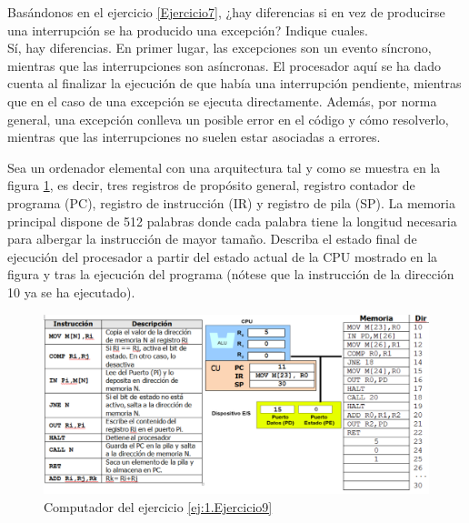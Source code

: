 \begin{ejercicio}
    Basándonos en el ejercicio \ref{Ejercicio7}, ¿hay diferencias si en vez de producirse una interrupción se ha producido una excepción? Indique cuales.\\

    Sí, hay diferencias. En primer lugar, las excepciones son un evento síncrono, mientras que las interrupciones son asíncronas. El procesador aquí se ha dado cuenta al finalizar la ejecución de que había una interrupción pendiente, mientras que en el caso de una excepción se ejecuta directamente. Además, por norma general, una excepción conlleva un posible error en el código y cómo resolverlo, mientras que las interrupciones no suelen estar asociadas a errores.
\end{ejercicio}


\begin{ejercicio}\label{ej:1.Ejercicio9}
    Sea un ordenador elemental con una arquitectura tal y como se muestra en la figura \ref{fig:Ej9_Computador}, es decir, tres registros de propósito general, registro contador de programa (PC), registro de instrucción (IR) y registro de pila (SP). La memoria principal dispone de 512 palabras donde cada palabra tiene la longitud necesaria para albergar la instrucción de mayor tamaño. Describa el estado final de ejecución del procesador a partir del estado actual de la CPU mostrado en la figura y tras la ejecución del programa (nótese que la instrucción de la dirección 10 ya se ha ejecutado).
    \begin{figure}[H]
        \centering
        \includegraphics[width=1.1\linewidth]{Imagenes/Ej9_Compuatdor.png}
        \caption{Computador del ejercicio \ref{ej:1.Ejercicio9}}
        \label{fig:Ej9_Computador}
    \end{figure}
    

\end{ejercicio}
